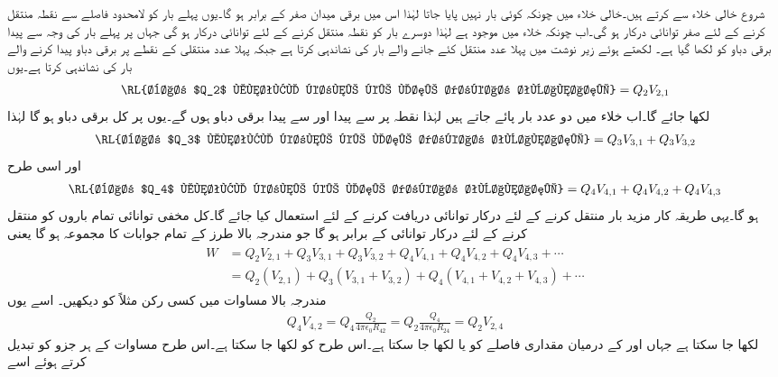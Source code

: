 شروع خالی خلاء سے کرتے ہیں۔خالی خلاء میں چونکہ کوئی بار نہیں پایا جاتا لہٰذا اس میں برقی میدان صفر کے برابر ہو گا۔یوں پہلے بار  کو لامحدود فاصلے سے  نقطہ  منتقل کرنے کے لئے صفر توانائی درکار ہو گی۔اب چونکہ خلاء میں  موجود ہے لہٰذا دوسرے بار  کو  نقطہ  منتقل کرنے کے لئے  توانائی درکار ہو گی جہاں  پر پہلے بار کی وجہ سے پیدا برقی دباو کو  لکھا گیا ہے۔ لکھتے ہوئے زیر نوشت میں پہلا عدد منتقل کئے جانے والے بار کی نشاندہی کرتا ہے جبکہ پہلا عدد  منتقلی کے نقطے پر برقی دباو پیدا کرنے والے بار کی نشاندہی کرتا ہے۔یوں
\begin{align*}
\textup{\RL{بار $Q_2$ منتقل کرنے کے لئے درکار توانائی}}=Q_2 V_{2,1}
\end{align*}
لکھا جائے گا۔اب خلاء میں دو عدد بار پائے جاتے ہیں لہٰذا  نقطہ  پر  سے پیدا  اور  سے پیدا  برقی دباو ہوں گے۔یوں  پر کل  برقی دباو ہو گا لہٰذا
\begin{align*}
\textup{\RL{بار $Q_3$ منتقل کرنے کے لئے درکار توانائی}}=Q_3 V_{3,1} +Q_3 V_{3,2}
\end{align*}
اور اسی طرح
\begin{align*}
\textup{\RL{بار $Q_4$ منتقل کرنے کے لئے درکار توانائی}}=Q_4 V_{4,1} +Q_4 V_{4,2}+Q_4 V_{4,3}
\end{align*}
ہو گا۔یہی طریقہ کار مزید بار منتقل کرنے کے لئے درکار توانائی دریافت کرنے کے لئے استعمال کیا جائے گا۔کل مخفی توانائی  تمام باروں کو منتقل کرنے کے لئے درکار توانائی کے برابر ہو گا جو مندرجہ بالا طرز کے تمام جوابات کا مجموعہ ہو گا یعنی
\begin{gather}
\begin{aligned}\label{مساوات_توانائی_بار_کثافت_توانائی_الف}
W&=Q_2 V_{2,1}+Q_3 V_{3,1} +Q_3 V_{3,2}+Q_4 V_{4,1} +Q_4 V_{4,2}+Q_4 V_{4,3}+\cdots\\
&=Q_2(V_{2,1})+Q_3( V_{3,1}+V_{3,2})+Q_4(V_{4,1} +V_{4,2}+V_{4,3})+\cdots
\end{aligned}
\end{gather}
مندرجہ بالا مساوات میں کسی رکن مثلاً  کو دیکھیں۔ اسے یوں
\begin{align*}
Q_4 V_{4,2} = Q_4 \frac{Q_2}{4\pi \epsilon_0 R_{42}}= Q_2 \frac{Q_4}{4\pi \epsilon_0 R_{24}}= Q_2 V_{2,4}
\end{align*}
 لکھا جا سکتا ہے جہاں  اور  کے درمیان مقداری فاصلے کو  یا  لکھا جا سکتا ہے۔اس طرح  کو  لکھا جا سکتا ہے۔اس طرح مساوات  کے ہر جزو کو تبدیل کرتے ہوئے اسے
